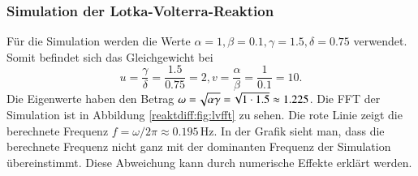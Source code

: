 \subsubsection{Simulation der Lotka-Volterra-Reaktion}

Für die Simulation werden die Werte \(\alpha = 1, \beta = 0.1, \gamma = 1.5, \delta = 0.75\) verwendet.
Somit befindet sich das Gleichgewicht bei
\begin{equation*}
    u = \frac{\gamma}{\delta} = \frac{1.5}{0.75} = 2, 
    v = \frac{\alpha}{\beta} = \frac{1}{0.1} = 10.
\end{equation*}
Die Eigenwerte haben den Betrag \(\omega = \!\sqrt{\alpha\gamma\mathstrut} = \!\sqrt{1 \cdot 1.5} \approx 1.225\).
Die FFT der Simulation ist in Abbildung \ref{reaktdiff:fig:lvfft} zu sehen.
Die rote Linie zeigt die berechnete Frequenz \(f = \omega / 2 \pi \approx 0.195\,\text{Hz}\).
In der Grafik sieht man, dass die berechnete Frequenz nicht ganz mit der dominanten Frequenz der Simulation übereinstimmt.
Diese Abweichung kann durch numerische Effekte erklärt werden.










